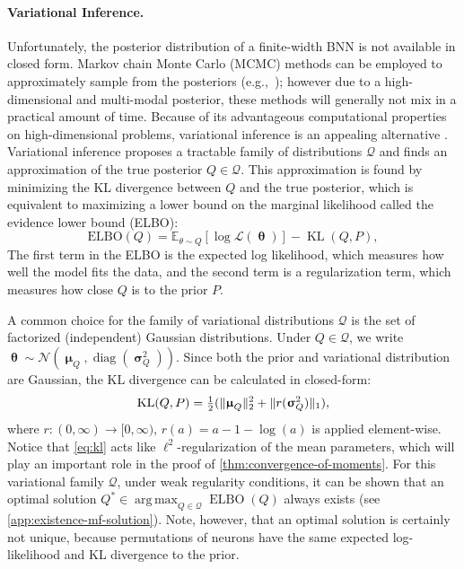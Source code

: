 \documentclass[twoside]{article}
\newcommand{\vmu}{\bm{\upmu}}
\newcommand{\vtheta}{\bm{\uptheta}}
\newcommand{\vsigma}{\bm{\upsigma}}
\renewcommand{\P}{\mathbb{P}}
\newcommand{\Q}{\mathbb{Q}}
\renewcommand{\Q}{\ensuremath{Q}}
\renewcommand{\P}{\ensuremath{P}}
\newcommand{\opspace}{}
\DeclareMathOperator*{\argmax}{arg\,max\opspace}
\newcommand{\diag}{\operatorname{diag}\opspace}
\newcommand{\KL}{\operatorname{KL}}
\newcommand{\Normal}{\mathcal{N}}
\DeclarePairedDelimiter\norm{\|}{\|}             %
\theoremstyle{theoremstyle}
\begin{document}
\paragraph{Variational Inference.}
Unfortunately, the posterior distribution of a finite-width BNN is not available in closed form. Markov chain Monte Carlo (MCMC) methods can be employed to approximately sample from the posteriors (e.g.,~\citealp{izmailov2021bayesian}); however due to a high-dimensional and multi-modal posterior, these methods will generally not mix in a practical amount of time. Because of its advantageous computational properties on high-dimensional problems, variational inference is an appealing alternative \citep{blundell2015weight}. Variational inference proposes a tractable family of distributions $\mathcal{Q}$ and finds an approximation of the true posterior $Q\in\mathcal{Q}$. This approximation is found by minimizing the KL divergence between $Q$ and the true posterior, which is equivalent to maximizing a lower bound on the marginal likelihood called the evidence lower bound (ELBO):
\begin{equation}
	\label{eq:elbo}
	\text{ELBO}(Q) = \mathbb{E}_{\theta\sim Q}[\log \mathcal{L}(\vtheta)] - \KL(Q, P),
\end{equation}
The first term in the ELBO is the expected log likelihood, which measures how well the model fits the data, and the second term is a regularization term, which measures how close $Q$ is to the prior $P$. 

A common choice for the family of variational distributions $\mathcal{Q}$ is the set of factorized (independent) Gaussian distributions.
Under $Q\in\mathcal{Q}$, we write $\vtheta \sim \Normal(\vmu_Q, \diag(\vsigma^2_Q))$. Since both the prior and variational distribution are Gaussian, the KL divergence can be calculated in closed-form:
\begin{equation}
	\KL(\Q, \P)
	=
	\tfrac12
	(\norm{\vmu_\Q}_2^2 + \norm{r(\vsigma^2_\Q)}_1), \label{eq:kl}
\end{equation}
where $r\colon (0, \infty) \to [0, \infty)$, $r(a) = a - 1 - \log(a)$ is applied element-wise.
Notice that \cref{eq:kl} acts like $\ell^2$-regularization of the mean parameters, which will play an important role in the proof of \cref{thm:convergence-of-moments}.
For this variational family $\mathcal{Q}$, under weak regularity conditions, it can be shown that an optimal solution $Q^* \in \argmax_{Q \in \mathcal{Q}} \operatorname{ELBO}(Q)$ always exists (see \cref{app:existence-mf-solution}).
Note, however, that an optimal solution is certainly not unique, because permutations of neurons have the same expected log-likelihood and KL divergence to the prior.
\end{document}
